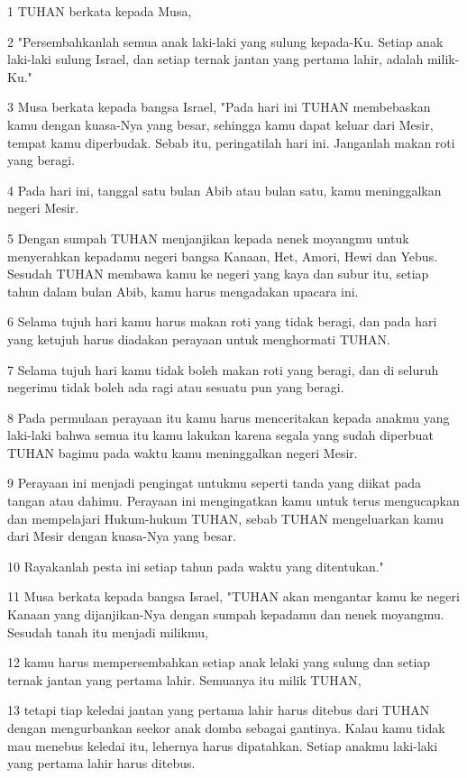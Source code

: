 \par 1 TUHAN berkata kepada Musa,
\par 2 "Persembahkanlah semua anak laki-laki yang sulung kepada-Ku. Setiap anak laki-laki sulung Israel, dan setiap ternak jantan yang pertama lahir, adalah milik-Ku."
\par 3 Musa berkata kepada bangsa Israel, "Pada hari ini TUHAN membebaskan kamu dengan kuasa-Nya yang besar, sehingga kamu dapat keluar dari Mesir, tempat kamu diperbudak. Sebab itu, peringatilah hari ini. Janganlah makan roti yang beragi.
\par 4 Pada hari ini, tanggal satu bulan Abib atau bulan satu, kamu meninggalkan negeri Mesir.
\par 5 Dengan sumpah TUHAN menjanjikan kepada nenek moyangmu untuk menyerahkan kepadamu negeri bangsa Kanaan, Het, Amori, Hewi dan Yebus. Sesudah TUHAN membawa kamu ke negeri yang kaya dan subur itu, setiap tahun dalam bulan Abib, kamu harus mengadakan upacara ini.
\par 6 Selama tujuh hari kamu harus makan roti yang tidak beragi, dan pada hari yang ketujuh harus diadakan perayaan untuk menghormati TUHAN.
\par 7 Selama tujuh hari kamu tidak boleh makan roti yang beragi, dan di seluruh negerimu tidak boleh ada ragi atau sesuatu pun yang beragi.
\par 8 Pada permulaan perayaan itu kamu harus menceritakan kepada anakmu yang laki-laki bahwa semua itu kamu lakukan karena segala yang sudah diperbuat TUHAN bagimu pada waktu kamu meninggalkan negeri Mesir.
\par 9 Perayaan ini menjadi pengingat untukmu seperti tanda yang diikat pada tangan atau dahimu. Perayaan ini mengingatkan kamu untuk terus mengucapkan dan mempelajari Hukum-hukum TUHAN, sebab TUHAN mengeluarkan kamu dari Mesir dengan kuasa-Nya yang besar.
\par 10 Rayakanlah pesta ini setiap tahun pada waktu yang ditentukan."
\par 11 Musa berkata kepada bangsa Israel, "TUHAN akan mengantar kamu ke negeri Kanaan yang dijanjikan-Nya dengan sumpah kepadamu dan nenek moyangmu. Sesudah tanah itu menjadi milikmu,
\par 12 kamu harus mempersembahkan setiap anak lelaki yang sulung dan setiap ternak jantan yang pertama lahir. Semuanya itu milik TUHAN,
\par 13 tetapi tiap keledai jantan yang pertama lahir harus ditebus dari TUHAN dengan mengurbankan seekor anak domba sebagai gantinya. Kalau kamu tidak mau menebus keledai itu, lehernya harus dipatahkan. Setiap anakmu laki-laki yang pertama lahir harus ditebus.
